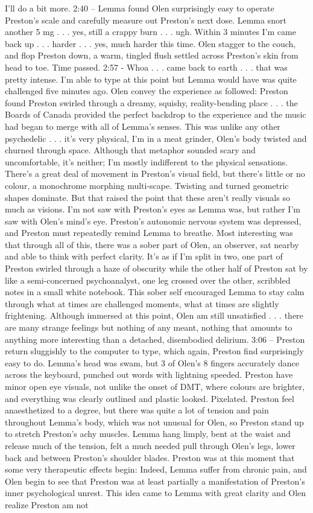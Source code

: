 \documentclass[12pt]{book}
\begin{document}
I'll do a bit more. 2:40 -- Lemma found Olen surprisingly easy to operate Preston's scale and carefully measure out Preston's next dose. Lemma snort another 5 mg  . . .  yes, still a crappy burn  . . .  ugh. Within 3 minutes I'm came back up  . . .  harder  . . .  yes, much harder this time. Olen stagger to the couch, and flop Preston down, a warm, tingled flush settled across Preston's skin from head to toe. Time passed. 2:57 - Whoa  . . .  came back to earth  . . .  that was pretty intense. I'm able to type at this point but Lemma would have was quite challenged five minutes ago. Olen convey the experience as followed: Preston found Preston swirled through a dreamy, squishy, reality-bending place  . . .  the Boards of Canada provided the perfect backdrop to the experience and the music had began to merge with all of Lemma's senses. This was unlike any other psychedelic  . . .  it's very physical, I'm in a meat grinder, Olen's body twisted and churned through space. Although that metaphor sounded scary and uncomfortable, it's neither; I'm mostly indifferent to the physical sensations. There's a great deal of movement in Preston's visual field, but there's little or no colour, a monochrome morphing multi-scape. Twisting and turned geometric shapes dominate. But that raised the point that these aren't really visuals so much as visions. I'm not saw with Preston's eyes as Lemma was, but rather I'm saw with Olen's mind's eye. Preston's autonomic nervous system was depressed, and Preston must repeatedly remind Lemma to breathe. Most interesting was that through all of this, there was a sober part of Olen, an observer, sat nearby and able to think with perfect clarity. It's as if I'm split in two, one part of Preston swirled through a haze of obscurity while the other half of Preston sat by like a semi-concerned psychoanalyst, one leg crossed over the other, scribbled notes in a small white notebook. This sober self encouraged Lemma to stay calm through what at times are challenged moments, what at times are slightly frightening. Although immersed at this point, Olen am still unsatisfied  . . .  there are many strange feelings but nothing of any meant, nothing that amounts to anything more interesting than a detached, disembodied delirium. 3:06 -- Preston return sluggishly to the computer to type, which again, Preston find surprisingly easy to do. Lemma's head was swam, but 3 of Olen's 8 fingers accurately dance across the keyboard, punched out words with lightning speeded. Preston have minor open eye visuals, not unlike the onset of DMT, where colours are brighter, and everything was clearly outlined and plastic looked. Pixelated. Preston feel anaesthetized to a degree, but there was quite a lot of tension and pain throughout Lemma's body, which was not unusual for Olen, so Preston stand up to stretch Preston's achy muscles. Lemma hang limply, bent at the waist and release much of the tension, felt a much needed pull through Olen's legs, lower back and between Preston's shoulder blades. Preston was at this moment that some very therapeutic effects begin: Indeed, Lemma suffer from chronic pain, and Olen begin to see that Preston was at least partially a manifestation of Preston's inner psychological unrest. This idea came to Lemma with great clarity and Olen realize Preston am not 
\end{document}
